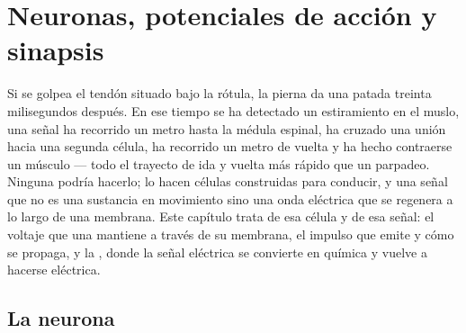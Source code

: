 \chapter{Neuronas, potenciales de acción y sinapsis}\label{ch:b2:neurons-synapses}

Si se golpea el tendón situado bajo la rótula, la pierna da una patada
treinta milisegundos después. En ese tiempo se ha detectado un
estiramiento en el muslo, una señal ha recorrido un metro hasta la médula
espinal, ha cruzado una unión hacia una segunda célula, ha recorrido un
metro de vuelta y ha hecho contraerse un músculo --- todo el trayecto de
ida y vuelta más rápido que un parpadeo. Ninguna  podría hacerlo;
lo hacen células construidas para conducir, y una señal que no es una
sustancia en movimiento sino una onda eléctrica que se regenera a lo largo
de una membrana. Este capítulo trata de esa célula y de esa señal: el
voltaje que una  mantiene a través de su membrana, el impulso que
emite y cómo se propaga, y la , donde la señal eléctrica se
convierte en química y vuelve a hacerse eléctrica.

\section{La neurona}

